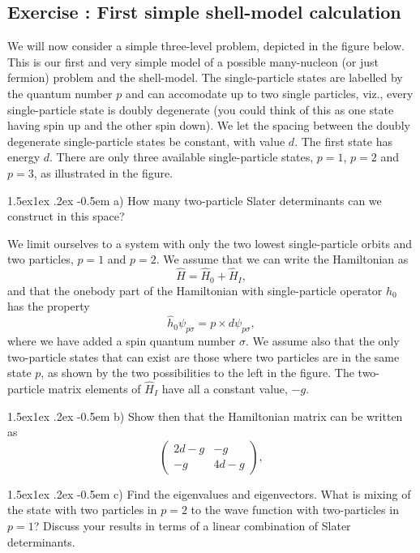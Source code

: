 \documentclass[%
twoside,                 %
final,                   %
10pt]{article}
\makeatletter
\newenvironment{doconceexercise}{}{}
\newcounter{doconceexercisecounter}
\newcommand\subex{\@startsection{paragraph}{4}{\z@}%
                  {1.5ex\@plus1ex \@minus.2ex}%
                  {-0.5em}%
                  {\normalfont\normalsize\bfseries}}
\makeatother
\begin{document}
\begin{doconceexercise}

\subsection*{Exercise \thedoconceexercisecounter: First simple shell-model calculation}


We will now consider a simple three-level problem, depicted in the figure below. This is our first and very simple model of a possible many-nucleon (or just fermion) problem and the shell-model.
The single-particle states are labelled by the quantum number $p$ and can accomodate up to two single particles,  viz., every single-particle state  is doubly degenerate (you could think of this as one state having spin up and the other spin down). 
We let the spacing between the doubly degenerate single-particle states be constant, with value $d$.  The first state
has energy $d$. There are only three available single-particle states, $p=1$, $p=2$ and $p=3$, as illustrated
in the figure.


\subex{a)}
How many two-particle Slater determinants can we construct in this space? 

We limit ourselves to a system with only the two lowest single-particle orbits and two particles, $p=1$ and $p=2$. We assume that we can write the Hamiltonian as
\[
       \hat{H}=\hat{H}_0+\hat{H}_I,
\]
and that the onebody part of the Hamiltonian with single-particle operator $\hat{h}_0$ has the property
\[
\hat{h}_0\psi_{p\sigma} = p\times d \psi_{p\sigma},
\]
where we have added a spin quantum number $\sigma$. 
We assume also that the only two-particle states that can exist are those where two particles are in the 
same state $p$, as shown by the two possibilities to the left in the figure.
The two-particle matrix elements of $\hat{H}_I$ have all a constant value, $-g$.

\subex{b)}
Show then that the Hamiltonian matrix can be written as 
\[
\left(\begin{array}{cc}2d-g &-g \\
-g &4d-g \end{array}\right),
\]

\subex{c)}
Find the eigenvalues and eigenvectors.  What is mixing of the state with two particles in $p=2$  to the wave function with two-particles in $p=1$? Discuss your results in terms of a linear combination of Slater determinants.


\end{doconceexercise}
\end{document}
